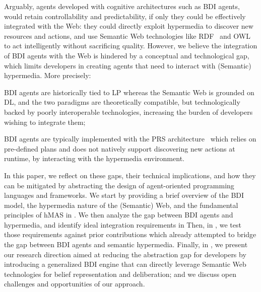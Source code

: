 \documentclass[
]{ceurart}
\begin{document}
Arguably,
agents developed with cognitive architectures 
such as \ac{BDI} agents,
would retain controllability and predictability,
if only they could be effectively integrated with the Web:
they could directly exploit hypermedia to discover new resources and actions, 
and use Semantic Web technologies like \ac{RDF}~\cite{RDF_Concepts_W3C:14} and \ac{OWL}~\cite{OWL_Syntax_W3C:12} 
to act intelligently without sacrificing quality.
%
However,
we believe
the integration of \ac{BDI} agents with the Web
is hindered by a conceptual and technological gap, 
which limits developers in creating agents that need to interact with (Semantic) hypermedia.
%
More precisely:
\begin{enumerate*}[label=\textbf{(G\arabic*)}]
  \item\label{gap:logic}
  \ac{BDI} agents are historically tied to \ac{LP}
  whereas the Semantic Web is grounded on \ac{DL},
  and the two paradigms are theoretically compatible, 
  but technologically backed by poorly interoperable technologies,
  increasing the burden of developers wishing to integrate them;
  
  \item\label{gap:open-world}
  \ac{BDI} agents are typically implemented with the \ac{PRS} architecture~\cite{georgeff1986pieee} 
  which relies on pre-defined plans and does not natively support discovering new actions at runtime,
  by interacting with the hypermedia environment.
\end{enumerate*}

In this paper, 
we reflect on these gaps,
their technical implications, %
and
how they can be mitigated by abstracting the design of agent-oriented programming languages and frameworks. 
%
We start by providing a brief overview of the \ac{BDI} model, 
the hypermedia nature of the (Semantic) Web,
and 
the fundamental principles of \ac{hMAS} in .
%
We then analyze the gap between \ac{BDI} agents and hypermedia, 
and identify ideal integration requirements in 
%
Then, 
in ,
we test those requirements against prior contributions 
which already attempted to bridge the gap between \ac{BDI} agents and semantic hypermedia.
%
Finally, 
in ,
we present our research direction
aimed at %
reducing the abstraction gap for developers
by introducing a generalized \ac{BDI} engine
that can directly leverage Semantic Web technologies for belief representation and deliberation;
and we discuss open challenges and opportunities of our approach.
\end{document}
